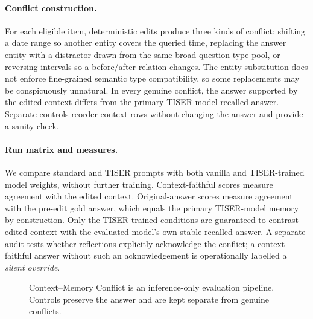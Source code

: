 \documentclass[conference]{IEEEtran}
\begin{document}
\paragraph{Conflict construction.}
For each eligible item, deterministic edits produce three kinds of conflict: shifting a date range so another entity covers the queried time, replacing the answer entity with a distractor drawn from the same broad question-type pool, or reversing intervals so a before/after relation changes. The entity substitution does not enforce fine-grained semantic type compatibility, so some replacements may be conspicuously unnatural. In every genuine conflict, the answer supported by the edited context differs from the primary TISER-model recalled answer. Separate controls reorder context rows without changing the answer and provide a sanity check.

\paragraph{Run matrix and measures.}
We compare standard and TISER prompts with both vanilla and TISER-trained model weights, without further training. Context-faithful scores measure agreement with the edited context. Original-answer scores measure agreement with the pre-edit gold answer, which equals the primary TISER-model memory by construction. Only the TISER-trained conditions are guaranteed to contrast edited context with the evaluated model's own stable recalled answer. A separate audit tests whether reflections explicitly acknowledge the conflict; a context-faithful answer without such an acknowledgement is operationally labelled a \emph{silent override}.

\begin{figure}[t]
\centering
{}
\caption{Context--Memory Conflict is an inference-only evaluation pipeline. Controls preserve the answer and are kept separate from genuine conflicts.}
\label{fig:pipeline}
\end{figure}
\end{document}
